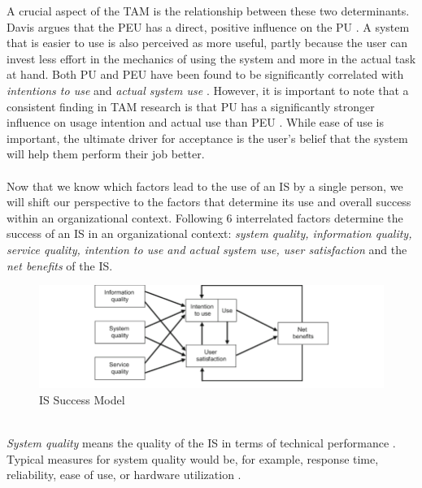 \documentclass[
	english,
	ruledheaders=section,%
	class=report,%
	thesis={type=bachelor},%
	accentcolor=1b,%
	custommargins=true,%
	marginpar=false,%
	parskip=half-,%
	fontsize=11pt,%
	DIV=14,
]{tudapub}
\begin{document}
A crucial aspect of the TAM is the relationship between these two determinants. Davis argues that the PEU has a direct, positive influence on the PU \parencite[p.~334]{Davis1989}. A system that is easier to use is also perceived as more useful, partly because the user can invest less effort in the mechanics of using the system and more in the actual task at hand. Both PU and PEU have been found to be significantly correlated with \textit{intentions to use} and \textit{actual system use} \parencite[p.~333]{Davis1989}. However, it is important to note that a consistent finding in TAM research is that PU has a significantly stronger influence on usage intention and actual use than PEU \parencite[p.~333]{Davis1989}. While ease of use is important, the ultimate driver for acceptance is the user's belief that the system will help them perform their job better.\\
\\
Now that we know which factors lead to the use of an IS by a single person, we will shift our perspective to the factors that determine its use and overall success within an organizational context.
Following \cite{DeloneMcLean2003ISSuccessTenYearUpdate} 6 interrelated factors determine the success of an IS in an organizational context: \textit{system quality, information quality, service quality, intention to use and actual system use, user satisfaction} and the \textit{net benefits} of the IS.\\
\begin{figure}[h!]
    \includegraphics[width=1\linewidth]{images/ISSuccess.png}
    \caption{IS Success Model \parencite[p.~24]{DeloneMcLean2003ISSuccessTenYearUpdate}}
    \label{fig:enter-label}
\end{figure}
\\
\textit{System quality} means the quality of the IS in terms of technical performance \parencite[p.~64]{DeloneMcLean2003ISSuccessTenYearUpdate}. Typical measures for system quality would be, for example, response time, reliability, ease of use, or hardware utilization \parencite[p.~64--65]{DeloneMcLean1992ISSuccess}.\\
\end{document}
